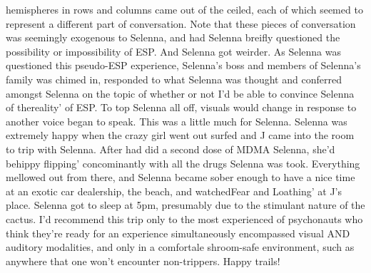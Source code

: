 \documentclass[12pt]{book}
\begin{document}
hemispheres in rows and columns came out of the ceiled, each of which seemed to represent a different part of conversation. Note that these pieces of conversation was seemingly exogenous to Selenna, and had Selenna breifly questioned the possibility or impossibility of ESP. And Selenna got weirder. As Selenna was questioned this pseudo-ESP experience, Selenna's boss and members of Selenna's family was chimed in, responded to what Selenna was thought and conferred amongst Selenna on the topic of whether or not I'd be able to convince Selenna of thereality' of ESP. To top Selenna all off, visuals would change in response to another voice began to speak. This was a little much for Selenna. Selenna was extremely happy when the crazy girl went out surfed and J came into the room to trip with Selenna. After had did a second dose of MDMA Selenna, she'd behippy flipping' concominantly with all the drugs Selenna was took. Everything mellowed out from there, and Selenna became sober enough to have a nice time at an exotic car dealership, the beach, and watchedFear and Loathing' at J's place. Selenna got to sleep at 5pm, presumably due to the stimulant nature of the cactus. I'd recommend this trip only to the most experienced of psychonauts who think they're ready for an experience simultaneously encompassed visual AND auditory modalities, and only in a comfortale shroom-safe environment, such as anywhere that one won't encounter non-trippers. Happy trails!
\end{document}
